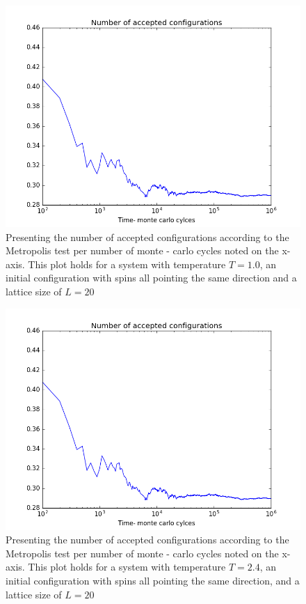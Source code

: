 \documentclass[12pt]{article}
\begin{document}
\iffalse
\begin{figure}[H]
\includegraphics[scale=0.6]{accept_config_ord_1.png}
\caption{Presenting the number of accepted configurations according to the Metropolis test per number of monte - carlo cycles noted on the x-axis. This plot holds for a system with temperature $T = 1.0$, an initial configuration with spins all pointing the same direction and a lattice size of $L = 20 $}\label{fig:accept_config_1_ord}
\end{figure}

\begin{figure}[H]
\includegraphics[scale=0.6]{accept_config_ord_2.png}
\caption{Presenting the number of accepted configurations according to the Metropolis test per number of monte - carlo cycles noted on the x-axis. This plot holds for a system with temperature $T = 2.4$, an initial configuration with spins all pointing the same direction, and a lattice size of $L = 20 $}\label{fig:accept_config_ord}
\end{figure}
\end{document}
